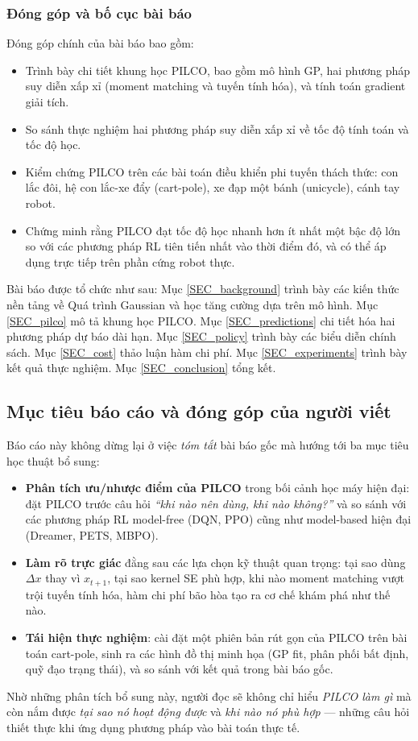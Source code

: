 \subsubsection{Đóng góp và bố cục bài báo}
\label{SUB_SUB_SEC_dong_gop}

Đóng góp chính của bài báo \cite{Deisenroth_2015} bao gồm:
\begin{itemize}
    \item[(i)] Trình bày chi tiết khung học PILCO, bao gồm mô hình GP, hai phương pháp suy diễn xấp xỉ (moment matching và tuyến tính hóa), và tính toán gradient giải tích.
    \item[(ii)] So sánh thực nghiệm hai phương pháp suy diễn xấp xỉ về tốc độ tính toán và tốc độ học.
    \item[(iii)] Kiểm chứng PILCO trên các bài toán điều khiển phi tuyến thách thức: con lắc đôi, hệ con lắc-xe đẩy (cart-pole), xe đạp một bánh (unicycle), cánh tay robot.
    \item[(iv)] Chứng minh rằng PILCO đạt tốc độ học nhanh hơn ít nhất một bậc độ lớn so với các phương pháp RL tiên tiến nhất vào thời điểm đó, và có thể áp dụng trực tiếp trên phần cứng robot thực.
\end{itemize}
\medskip

Bài báo được tổ chức như sau: Mục \ref{SEC_background} trình bày các kiến thức nền tảng về Quá trình Gaussian và học tăng cường dựa trên mô hình. Mục \ref{SEC_pilco} mô tả khung học PILCO. Mục \ref{SEC_predictions} chi tiết hóa hai phương pháp dự báo dài hạn. Mục \ref{SEC_policy} trình bày các biểu diễn chính sách. Mục \ref{SEC_cost} thảo luận hàm chi phí. Mục \ref{SEC_experiments} trình bày kết quả thực nghiệm. Mục \ref{SEC_conclusion} tổng kết.
\medskip

\subsection{Mục tiêu báo cáo và đóng góp của người viết}
\label{SUB_SEC_muctieu_donggop}

Báo cáo này không dừng lại ở việc \textit{tóm tắt} bài báo gốc mà hướng tới ba mục tiêu học thuật bổ sung:

\begin{itemize}
    \item \textbf{Phân tích ưu/nhược điểm của PILCO} trong bối cảnh học máy hiện đại: đặt PILCO trước câu hỏi \textit{``khi nào nên dùng, khi nào không?''} và so sánh với các phương pháp RL model-free (DQN, PPO) cũng như model-based hiện đại (Dreamer, PETS, MBPO).
    \item \textbf{Làm rõ trực giác} đằng sau các lựa chọn kỹ thuật quan trọng: tại sao dùng $\Delta x$ thay vì $x_{t+1}$, tại sao kernel SE phù hợp, khi nào moment matching vượt trội tuyến tính hóa, hàm chi phí bão hòa tạo ra cơ chế khám phá như thế nào.
    \item \textbf{Tái hiện thực nghiệm}: cài đặt một phiên bản rút gọn của PILCO trên bài toán cart-pole, sinh ra các hình đồ thị minh họa (GP fit, phân phối bất định, quỹ đạo trạng thái), và so sánh với kết quả trong bài báo gốc.
\end{itemize}

Nhờ những phân tích bổ sung này, người đọc sẽ không chỉ hiểu \textit{PILCO làm gì} mà còn nắm được \textit{tại sao nó hoạt động được} và \textit{khi nào nó phù hợp} --- những câu hỏi thiết thực khi ứng dụng phương pháp vào bài toán thực tế.
\medskip
